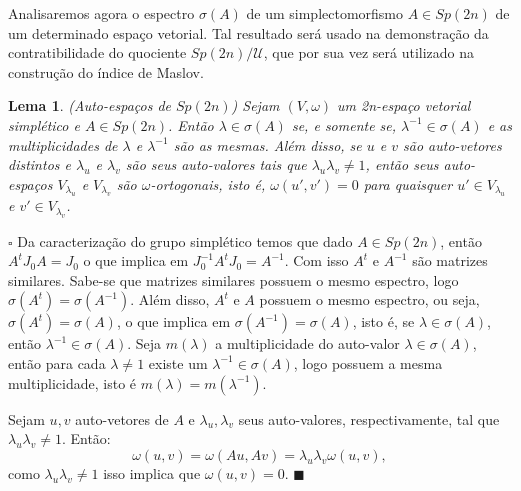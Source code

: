 \documentclass[12pt]{book}
\newtheorem{lema}[teorema]{Lema}
\newenvironment{prova}[1]{$\square$ #1}{\hfill$\blacksquare$}
\newcommand{\espectrooperador}[1]{\sigma(#1)}
\newcommand{\estruturacomplexa}{J_{0}}
\newcommand{\gruposimpletico}[1]{Sp(#1)}
\begin{document}
	Analisaremos agora o espectro $\espectrooperador{A}$ de um simplectomorfismo $A \in \gruposimpletico{2n}$ de um determinado espaço vetorial. Tal resultado será usado na demonstração da contratibilidade do quociente $\gruposimpletico{2n}/\mathcal{U}$, que por sua vez será utilizado na construção do índice de Maslov.
	
	\begin{lema}
		(Auto-espaços de $\gruposimpletico{2n}$) Sejam $(V, \omega)$ um 2n-espaço vetorial simplético e $A \in \gruposimpletico{2n}$. Então $\lambda \in \espectrooperador{A}$ se, e somente se, $\lambda^{-1} \in \espectrooperador{A}$ e as multiplicidades de $\lambda$ e $\lambda^{-1}$ são as mesmas. Além disso, se $u$ e $v$ são auto-vetores distintos e $\lambda_{u}$ e $\lambda_{v}$ são seus auto-valores tais que $\lambda_{u}\lambda_{v} \neq 1$, então seus auto-espaços $V_{\lambda_{u}}$ e $V_{\lambda_{v}}$ são $\omega$-ortogonais, isto é, $\omega(u',v') = 0$ para quaisquer $u' \in V_{\lambda_{u}}$ e $v' \in V_{\lambda_{v}}$. 
	\end{lema}
	\begin{prova}
		Da caracterização do grupo simplético temos que dado $A \in \gruposimpletico{2n}$, então $A^{t}\estruturacomplexa A = \estruturacomplexa$ o que implica em $\estruturacomplexa^{-1}A^{t}\estruturacomplexa = A^{-1}$. Com isso $A^{t}$ e $A^{-1}$ são matrizes similares. Sabe-se que matrizes similares possuem o mesmo espectro, logo $\espectrooperador{A^{t}}=\espectrooperador{A^{-1}}$. Além disso, $A^{t}$ e $A$ possuem o mesmo espectro, ou seja, $\espectrooperador{A^{t}} = \espectrooperador{A}$, o que implica em $\espectrooperador{A^{-1}} = \espectrooperador{A}$, isto é, se $\lambda \in \espectrooperador{A}$, então $\lambda^{-1} \in \espectrooperador{A}$. Seja $m(\lambda)$ a multiplicidade do auto-valor $\lambda \in \espectrooperador{A}$, então para cada $\lambda \neq 1$ existe um $\lambda^{-1} \in \espectrooperador{A}$, logo possuem a mesma multiplicidade, isto é $m(\lambda) = m(\lambda^{-1})$.
		
		Sejam $u, v$ auto-vetores de $A$ e $\lambda_{u}, \lambda_{v}$ seus auto-valores, respectivamente, tal que $\lambda_{u}\lambda_{v}\neq 1$. Então:
		$$
		\omega(u,v)=\omega(Au,Av) = \lambda_{u}\lambda_{v}\omega(u,v), 
		$$
		como $\lambda_{u}\lambda_{v}\neq 1$ isso implica que $\omega(u,v)=0$.
	\end{prova}
	
\end{document}
